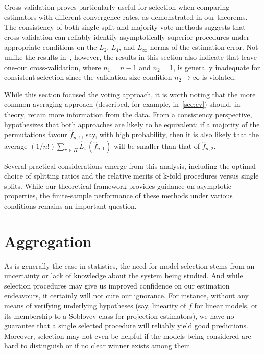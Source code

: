 \documentclass[11pt, letter paper]{article}
\newcommand{\1}{\mathmybb{1}}
\newcommand{\0}{\emptyset}
\newcommand{\fhat}[2]{\hat{f}_{#1, #2}}
\begin{document}
Cross-validation proves particularly useful for selection when comparing estimators with different convergence rates, as demonstrated in our theorems. The consistency of both single-split and majority-vote methods suggests that cross-validation can reliably identify asymptotically superior procedures under appropriate conditions on the \(L_{2}\), \(L_4\), and \(L_{\infty}\) norms of the estimation error. Not unlike the results in~\textcite{shao_1993}, however, the results in this section also indicate that leave-one-out cross-validation, where $n_1 = n-1$ and $n_2 = 1$, is generally inadequate for consistent selection since the validation size condition $n_2 \to \infty$ is violated.

While this section focused the voting approach, it is worth noting that the more common averaging approach (described, for example, in~\ref{sec:cv}) should, in theory, retain more information from the data. From a consistency perspective, \textcite{yang_2007} hypothesizes that both approaches are likely to be equivalent: if a majority of the permutations favour \(\fhat{n}{1}\), say, with high probability, then it is also likely that the average \((1/n!)\sum_{\pi\in\Pi}\hat{L}_{\pi}(\fhat{n}{1})\) will be smaller than that of \(\fhat{n}{2}\).

Several practical considerations emerge from this analysis, including the optimal choice of splitting ratios and the relative merits of k-fold procedures versus single splits. While our theoretical framework provides guidance on asymptotic properties, the finite-sample performance of these methods under various conditions remains an important question. 


\section{Aggregation}

As is generally the case in statistics, the need for model selection stems from an uncertainty or lack of knowledge about the system being studied. And while selection procedures may give us improved confidence on our estimation endeavours, it certainly will not cure our ignorance. For instance, without any means of verifying underlying hypotheses (say, linearity of \(f\) for linear models, or its membership to a Soblovev class for projection estimators), we have no guarantee that a single selected procedure will reliably yield good predictions. Moreover, selection may not even be helpful if the models being considered are hard to distinguish or if no clear winner exists among them. 
\end{document}
